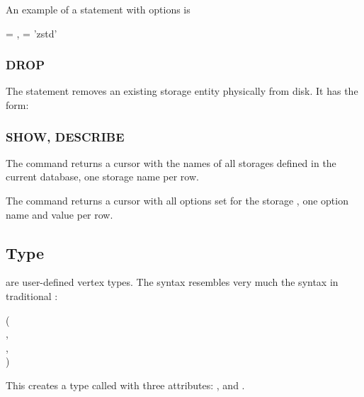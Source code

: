 An example of a  statement with options is

 
  = ,
               = 'zstd'

\subsubsection{DROP}
The  statement removes
an existing storage entity
physically from disk.
It has the form:

 


\subsubsection{SHOW, DESCRIBE}
The command 
returns a cursor with the names of all
storages defined in the current database,
one storage name per row.

The command  
returns a cursor with all options set for the storage
, one option name and value
per row.

\subsection{Type}
 are user-defined vertex types.
The syntax resembles very much
the  syntax
in traditional \sql:

\begin{minipage}{\textwidth}
  ( \\
\hspace*{1cm}  , \\
\hspace*{1cm} , \\
\hspace*{1cm} )
\end{minipage}

This creates a type called 
with three attributes:
,  and .

